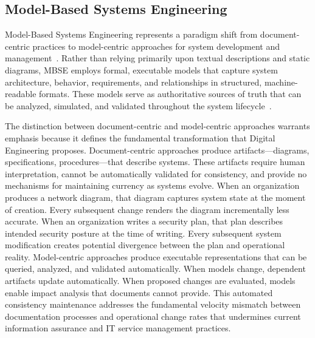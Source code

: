 \subsection{Model-Based Systems Engineering}

Model-Based Systems Engineering represents a paradigm shift from document-centric practices to model-centric approaches for system development and management~\parencite{Hutchison_2020}. Rather than relying primarily upon textual descriptions and static diagrams, MBSE employs formal, executable models that capture system architecture, behavior, requirements, and relationships in structured, machine-readable formats. These models serve as authoritative sources of truth that can be analyzed, simulated, and validated throughout the system lifecycle~\parencite{Hutchinson_2021}.

The distinction between document-centric and model-centric approaches warrants emphasis because it defines the fundamental transformation that Digital Engineering proposes. Document-centric approaches produce artifacts---diagrams, specifications, procedures---that describe systems. These artifacts require human interpretation, cannot be automatically validated for consistency, and provide no mechanisms for maintaining currency as systems evolve. When an organization produces a network diagram, that diagram captures system state at the moment of creation. Every subsequent change renders the diagram incrementally less accurate. When an organization writes a security plan, that plan describes intended security posture at the time of writing. Every subsequent system modification creates potential divergence between the plan and operational reality. Model-centric approaches produce executable representations that can be queried, analyzed, and validated automatically. When models change, dependent artifacts update automatically. When proposed changes are evaluated, models enable impact analysis that documents cannot provide. This automated consistency maintenance addresses the fundamental velocity mismatch between documentation processes and operational change rates that undermines current information assurance and IT service management practices.

